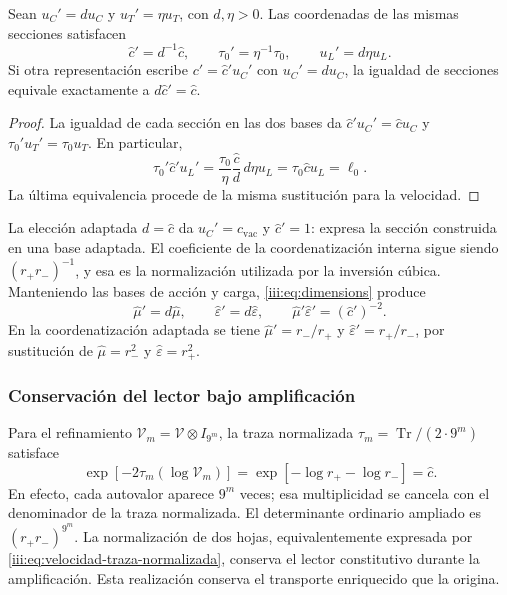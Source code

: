 \begin{proposition}
Sean $u_C'=d u_C$ y $u_T'=\eta u_T$, con $d,\eta>0$.
Las coordenadas de las mismas secciones satisfacen
\begin{equation}
 \widehat c'=d^{-1}\widehat c,
 \qquad \tau_0'=\eta^{-1}\tau_0,
 \qquad u_L'=d\eta u_L.
 \label{iii:eq:velocidad-cambio-carta}
\end{equation}
Si otra representación escribe $c'=\widehat c' u_C'$ con $u_C'=d u_C$,
la igualdad de secciones equivale exactamente a $d\widehat c'=\widehat c$.
\end{proposition}
\begin{proof}
La igualdad de cada sección en las dos bases da
$\widehat c'u_C'=\widehat c u_C$ y $\tau_0'u_T'=\tau_0u_T$.
En particular,
\[
 \tau_0'\widehat c'u_L'
 =\frac{\tau_0}{\eta}\frac{\widehat c}{d}\,d\eta u_L
 =\tau_0\widehat c u_L=\ell_0.
\]
La última equivalencia procede de la misma sustitución para la velocidad.
\end{proof}

La elección adaptada $d=\widehat c$ da $u_C'=c_{\mathrm{vac}}$ y
$\widehat c'=1$: expresa la sección construida en una base adaptada.
El coeficiente de la coordenatización interna sigue siendo $(r_+r_-)^{-1}$, y esa
es la normalización utilizada por la inversión cúbica. Manteniendo las
bases de acción y carga, \eqref{iii:eq:dimensions} produce
\[
 \widehat\mu'=d\widehat\mu,\qquad
 \widehat\varepsilon'=d\widehat\varepsilon,\qquad
 \widehat\mu'\widehat\varepsilon'=(\widehat c')^{-2}.
\]
En la coordenatización adaptada se tiene $\widehat\mu'=r_-/r_+$ y
$\widehat\varepsilon'=r_+/r_-$, por sustitución de
$\widehat\mu=r_-^2$ y $\widehat\varepsilon=r_+^2$.

\subsubsection{Conservación del lector bajo amplificación}

Para el refinamiento $\mathcal V_m=\mathcal V\otimes I_{9^m}$, la
traza normalizada $\tau_m=\operatorname{Tr}/(2\cdot9^m)$ satisface
\begin{equation}
 \exp[-2\tau_m(\log\mathcal V_m)]
 =\exp[-\log r_+-\log r_-]=\widehat c.
 \label{iii:eq:velocidad-traza-normalizada}
\end{equation}
En efecto, cada autovalor aparece $9^m$ veces; esa multiplicidad se
cancela con el denominador de la traza normalizada. El determinante
ordinario ampliado es $(r_+r_-)^{9^m}$. La normalización de dos hojas,
equivalentemente expresada por \eqref{iii:eq:velocidad-traza-normalizada},
conserva el lector constitutivo durante la amplificación. Esta
realización conserva el transporte enriquecido que la origina.

